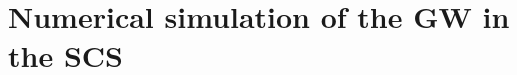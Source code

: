 
\chapter[Numerical simulation of the GW in the SCS]{Numerical simulation of the GW in the SCS}
\label{ch:simulation}



%
%
%
%
%
%
